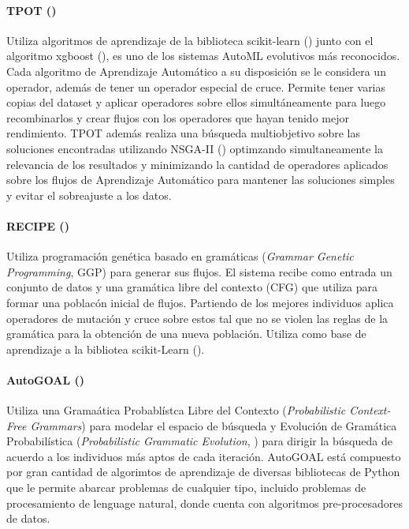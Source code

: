 \paragraph*{TPOT (\cite{pmlr-v64-olson_tpot_2016})} Utiliza algoritmos de aprendizaje de la biblioteca scikit-learn (\cite{pedregosa2011scikit}) junto con el algoritmo xgboost (\cite{chen2016xgboost}), es uno de los sistemas AutoML evolutivos m\'as reconocidos. Cada algoritmo de Aprendizaje Autom\'atico a su disposici\'on se le considera un operador, adem\'as de tener un operador especial de cruce. Permite tener varias copias del dataset y aplicar operadores sobre ellos simult\'aneamente para luego recombinarlos y crear flujos con los operadores que hayan tenido mejor rendimiento. TPOT adem\'as realiza una b\'usqueda multiobjetivo sobre las soluciones encontradas utilizando NSGA-II (\cite{deb2002fast}) optimzando simultaneamente la relevancia de los resultados y minimizando la cantidad de operadores aplicados sobre los flujos de Aprendizaje Autom\'atico para mantener las soluciones simples y evitar el sobreajuste a los datos.

\paragraph*{RECIPE (\cite{de2017recipe})} Utiliza programaci\'on gen\'etica basado en gram\'aticas (\textit{Grammar Genetic Programming}, GGP) para generar sus flujos. El sistema recibe como entrada un conjunto de datos y una gram\'atica libre del contexto (CFG) que utiliza para formar una poblac\'on inicial de flujos. Partiendo de los mejores individuos aplica operadores de mutaci\'on y cruce sobre estos tal que no se violen las reglas de la gram\'atica para la obtenci\'on de una nueva poblaci\'on. Utiliza como base de aprendizaje a la bibliotea scikit-Learn (\cite{pedregosa2011scikit}).
 

\paragraph{AutoGOAL (\cite{estevez2020solving})} Utiliza una Grama\'atica Probabl\'istca Libre del Contexto (\textit{Probabilistic Context-Free Grammars}) para modelar el espacio de b\'usqueda y Evoluci\'on de Gram\'atica  Probabil\'istica (\textit{Probabilistic Grammatic Evolution}, \cite{megane2021probabilistic}) para dirigir la b\'usqueda de acuerdo a los individuos m\'as aptos de cada iteraci\'on. AutoGOAL est\'a compuesto por gran cantidad de algorimtos de aprendizaje de diversas bibliotecas de Python que le  permite abarcar problemas de cualquier tipo, incluido problemas de procesamiento de lenguage natural, donde cuenta con algoritmos pre-procesadores de datos.

